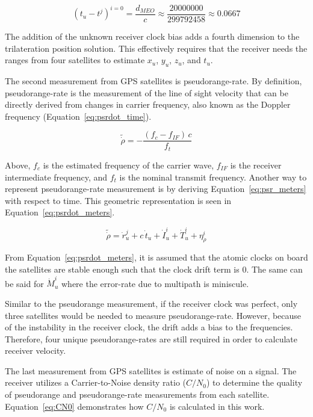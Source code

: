 \begin{equation}\label{eq:nominalOffset}
    {\left(t_u - t^{j} \right)}^{i = 0} = \frac{d_{MEO}}{c} \approx \frac{20000000}{299792458} \approx 0.0667
\end{equation}

The addition of the unknown receiver clock bias adds a fourth dimension to the trilateration position solution. This effectively requires that the receiver needs the ranges from four satellites to estimate \(x_u\), \(y_u\), \(z_u\), and \(t_u\).

The second measurement from GPS satellites is pseudorange-rate. By definition, pseudorange-rate is the measurement of the line of sight velocity that can be directly derived from changes in carrier frequency, also known as the Doppler frequency (Equation~\ref{eq:psrdot_time}).

\begin{equation}\label{eq:psrdot_time}
    \tilde{\dot{\rho}} = - \frac{\left(f_c - f_{IF}\right)\,c}{f_t}
\end{equation}

Above, \(f_c\) is the estimated frequency of the carrier wave, \(f_{IF}\) is the receiver intermediate frequency, and \(f_t\) is the nominal transmit frequency. Another way to represent pseudorange-rate measurement is by deriving Equation~\ref{eq:psr_meters} with respect to time. This geometric representation is seen in Equation~\ref{eq:psrdot_meters}.

\begin{equation}\label{eq:psrdot_meters}
    \tilde{\dot{\rho}} = \dot{r}_u^j + c\,\dot{t}_u + \dot{I}^i_u + \dot{T}^i_u + \eta^i_{\dot{\rho}}
\end{equation}

From Equation~\ref{eq:psrdot_meters}, it is assumed that the atomic clocks on board the satellites are stable enough such that the clock drift term is \(0\). The same can be said for \(\dot{M}^i_u\) where the error-rate due to multipath is miniscule.

Similar to the pseudorange measurement, if the receiver clock was perfect, only three satellites would be needed to measure pseudorange-rate. However, because of the instability in the receiver clock, the drift adds a bias to the frequencies. Therefore, four unique pseudorange-rates are still required in order to calculate receiver velocity.

The last measurement from GPS satellites is estimate of noise on a signal. The receiver utilizes a Carrier-to-Noise density ratio (\(C/N_0\)) to determine the quality of pseudorange and pseudorange-rate measurements from each satellite. Equation~\ref{eq:CN0} demonstrates how \(C/N_0\) is calculated in this work.


